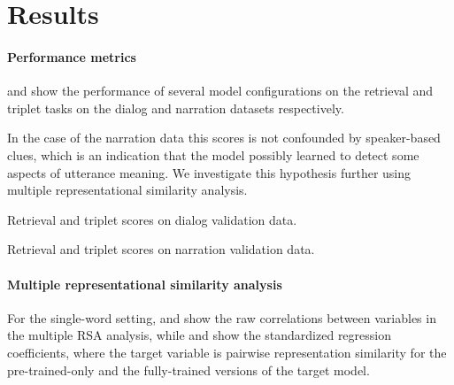 \section{Results}
\label{sec:results}
\paragraph{Performance metrics}
 and  show
the performance of several model configurations on the retrieval and
triplet tasks on the dialog and narration datasets respectively.

In the case of the narration data this scores is not confounded by
speaker-based clues, which is an indication that the model possibly
learned to detect some aspects of utterance meaning. We investigate
this hypothesis further using multiple representational similarity
analysis.
 

 \begin{table}
   \centering
   
   \caption{Retrieval and triplet scores on dialog validation data.}
   \label{tab:scores-dialog}
 \end{table}

\begin{table}
   \centering
   
   \caption{Retrieval and triplet scores on narration validation data.}
   \label{tab:scores-narration}
 \end{table}
 
 
\paragraph{Multiple representational similarity analysis}

For the single-word setting, 
 and  show the raw
correlations between variables in the multiple RSA analysis, while
 and  show the
standardized regression coefficients, where the target variable is
pairwise representation similarity for the pre-trained-only and the
fully-trained versions of the target model.



